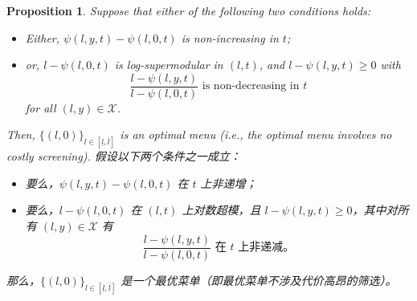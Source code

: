 \documentclass[12pt,letterpaper]{article}
\newenvironment{original}{\color{black}\noindent}{}
\newenvironment{translation}{\color{blue}\noindent}{}
\theoremstyle{plain}
\newtheorem{prop}{Proposition}
\theoremstyle{definition}
\theoremstyle{remark}
\renewcommand{\1}{\mathds{1}}
\theoremstyle{definition}
\begin{document}
\begin{prop}\label{prop:ordeal}
\begin{original}
Suppose that either of the following two conditions holds:
\begin{itemize}
    \item[(a)] Either, $\psi(l, y, t) - \psi(l, 0, t)$ is non-increasing in $t$;
    \item[(b)] or, $l-\psi(l, 0, t)$ is log-supermodular in $(l, t)$,  and $l - \psi(l, y, t) \geq 0$ with
    \[\frac{l - \psi(l, y, t)}{l - \psi(l, 0, t)} \text{ is non-decreasing in $t$}\]
    for all $(l, y) \in \mathcal{X}$.
\end{itemize}
Then, $\{(l, 0)\}_{l\in [\underline{l}, \overline{l}]}$ is an optimal menu (i.e., the optimal menu involves no costly screening).
\end{original}
\begin{translation}
假设以下两个条件之一成立：
\begin{itemize}
    \item[(a)] 要么，$\psi(l, y, t) - \psi(l, 0, t)$ 在 $t$ 上非递增；
    \item[(b)] 要么，$l-\psi(l, 0, t)$ 在 $(l, t)$ 上对数超模，且 $l - \psi(l, y, t) \geq 0$，其中对所有 $(l, y) \in \mathcal{X}$ 有
    \[\frac{l - \psi(l, y, t)}{l - \psi(l, 0, t)} \text{ 在 $t$ 上非递减。}\]
\end{itemize}
那么，$\{(l, 0)\}_{l\in [\underline{l}, \overline{l}]}$ 是一个最优菜单（即最优菜单不涉及代价高昂的筛选）。
\end{translation}
\end{prop}
\end{document}
